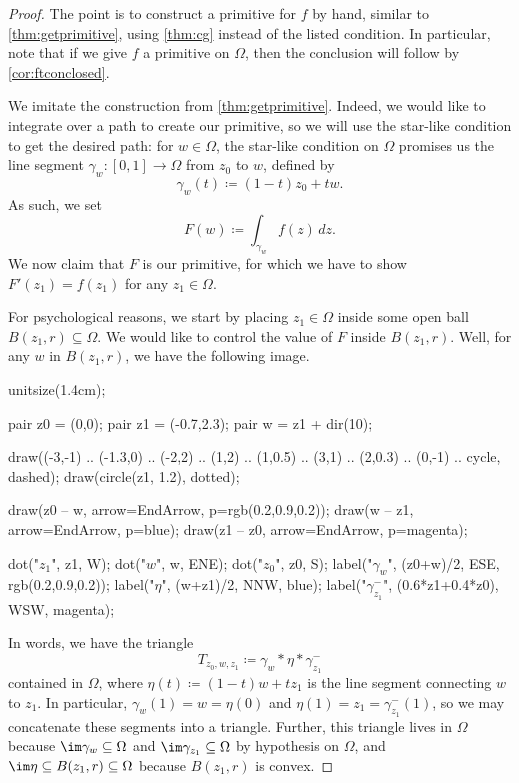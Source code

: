 \documentclass[../notes.tex]{subfiles}
\begin{document}
\begin{proof}
	The point is to construct a primitive for $f$ by hand, similar to \autoref{thm:getprimitive}, using \autoref{thm:cg} instead of the listed condition. In particular, note that if we give $f$ a primitive on $\Omega$, then the conclusion will follow by \autoref{cor:ftconclosed}.
	
	We imitate the construction from \autoref{thm:getprimitive}. Indeed, we would like to integrate over a path to create our primitive, so we will use the star-like condition to get the desired path: for $w\in\Omega$, the star-like condition on $\Omega$ promises us the line segment $\gamma_w\colon [0,1]\to\Omega$ from $z_0$ to $w$, defined by
	\[\gamma_w(t)\coloneqq (1-t)z_0+tw.\]
	As such, we set
	\[F(w)\coloneqq \int_{\gamma_w}f(z)\,dz.\]
	We now claim that $F$ is our primitive, for which we have to show $F'(z_1)=f(z_1)$ for any $z_1\in\Omega$.
	
	For psychological reasons, we start by placing $z_1\in\Omega$ inside some open ball $B(z_1,r)\subseteq\Omega$. We would like to control the value of $F$ inside $B(z_1,r)$. Well, for any $w$ in $B(z_1,r)$, we have the following image.
	\begin{center}
		\begin{asy}
			unitsize(1.4cm);

			pair z0 = (0,0);
			pair z1 = (-0.7,2.3);
			pair w = z1 + dir(10);

			draw((-3,-1) .. (-1.3,0) .. (-2,2) .. (1,2) .. (1,0.5) .. (3,1) .. (2,0.3) .. (0,-1) .. cycle, dashed);
			draw(circle(z1, 1.2), dotted);

			draw(z0 -- w, arrow=EndArrow, p=rgb(0.2,0.9,0.2));
			draw(w -- z1, arrow=EndArrow, p=blue);
			draw(z1 -- z0, arrow=EndArrow, p=magenta);

			dot("$z_1$", z1, W);
			dot("$w$", w, ENE);
			dot("$z_0$", z0, S);
			label("$\gamma_w$", (z0+w)/2, ESE, rgb(0.2,0.9,0.2));
			label("$\eta$", (w+z1)/2, NNW, blue);
			label("$\gamma_{z_1}^-$", (0.6*z1+0.4*z0), WSW, magenta);
		\end{asy}
	\end{center}
	In words, we have the triangle
	\[T_{z_0,w,z_1}\coloneqq \gamma_w*\eta*\gamma_{z_1}^-\]
	contained in $\Omega$, where $\eta(t)\coloneqq (1-t)w+tz_1$ is the line segment connecting $w$ to $z_1$. In particular, $\gamma_w(1)=w=\eta(0)$ and $\eta(1)=z_1=\gamma_{z_1}^-(1)$, so we may concatenate these segments into a triangle. Further, this triangle lives in $\Omega$ because $\im\gamma_w\subseteq\Omega$ and $\im\gamma_{z_1}\subseteq\Omega$ by hypothesis on $\Omega$, and $\im\eta\subseteq B(z_1,r)\subseteq\Omega$ because $B(z_1,r)$ is convex.


\end{proof}
\end{document}

